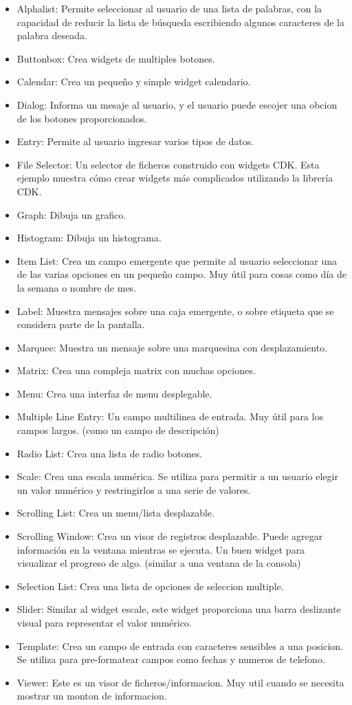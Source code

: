 \documentclass{article}
\begin{document}
\begin{itemize}
  \item Alphalist: Permite seleccionar al usuario de una lista de palabras, con
    la capacidad de reducir la lista de búsqueda escribiendo algunos caracteres
    de la palabra deseada.
  \item Buttonbox: Crea widgets de multiples botones.
  \item Calendar: Crea un pequeño y simple widget calendario.
  \item Dialog: Informa un mesaje al usuario, y el usuario puede escojer una obcion de los botones proporcionados.
  \item Entry: Permite al usuario ingresar varios tipos de datos.
  \item File Selector: Un selector de ficheros construido con widgets CDK. Esta
    ejemplo muestra cómo crear widgets más complicados utilizando la librería
    CDK.
  \item Graph: Dibuja un grafico.
  \item Histogram: Dibuja un histograma.
  \item Item List: Crea un campo emergente que permite al usuario seleccionar
    una de las varias opciones en un pequeño campo. Muy útil para cosas como
    día de la semana o nombre de mes.
  \item Label: Muestra mensajes sobre una caja emergente, o sobre etiqueta que se considera parte de la pantalla.
  \item Marquee: Muestra un mensaje sobre una marquesina con desplazamiento.
  \item Matrix: Crea una compleja matrix con muchas opciones.
  \item Menu: Crea una interfaz de menu desplegable.
  \item Multiple Line Entry: Un campo multilinea de entrada. Muy útil para los
    campos largos. (como un campo de descripción)
  \item Radio List: Crea una lista de radio botones.
  \item Scale: Crea una escala numérica. Se utiliza para permitir a un usuario
    elegir un valor numérico y restringirlos a una serie de valores.
  \item Scrolling List: Crea un menu/lista desplazable.
  \item Scrolling Window: Crea un visor de registros desplazable. Puede agregar
    información en la ventana mientras se ejecuta. Un buen widget para
    visualizar el progreso de algo. (similar a una ventana de la consola)
  \item Selection List: Crea una lista de opciones de seleccion multiple.
  \item Slider: Similar al widget escale, este widget proporciona una barra
    deslizante visual para representar el valor numérico.
  \item Template: Crea un campo de entrada con caracteres sensibles a una
    posicion. Se utiliza para pre-formatear campos como fechas y numeros de
    telefono.
  \item Viewer: Este es un visor de ficheros/informacion. Muy util cuando se
    necesita mostrar un monton de informacion.
\end{itemize}
\end{document}

